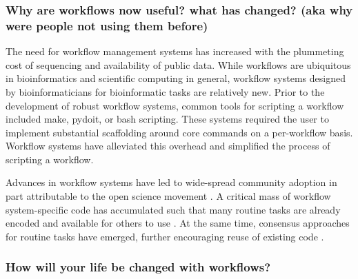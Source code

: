 \documentclass[10pt,letterpaper]{article}
\begin{document}
\subsubsection*{Why are workflows now useful? what has changed? (aka why were people not using them before)}
 
The need for workflow management systems has increased with the plummeting cost of sequencing and availability of public data.
While workflows are ubiquitous in bioinformatics and scientific computing in general, workflow systems designed by bioinformaticians for bioinformatic tasks are relatively new. 
Prior to the development of robust workflow systems, common tools for scripting a workflow included make, pydoit, or bash scripting. 
These systems required the user to implement substantial scaffolding around core commands on a per-workflow basis. 
Workflow systems have alleviated this overhead and simplified the process of scripting a workflow.

Advances in workflow systems have led to wide-spread community adoption in part attributable to the open science movement \cite{strozzi2019scalable}. 
A critical mass of workflow system-specific code has accumulated such that many routine tasks are already encoded and available for others to use \citep{ewels2020nf, cokelaer2017sequana}.
At the same time, consensus approaches for routine tasks have emerged, further encouraging reuse of existing code \citep{conesa2016survey, quince2017shotgun, luecken2019current, da2016next, knight2018best}.

\subsubsection*{How will your life be changed with workflows?}
\end{document}
